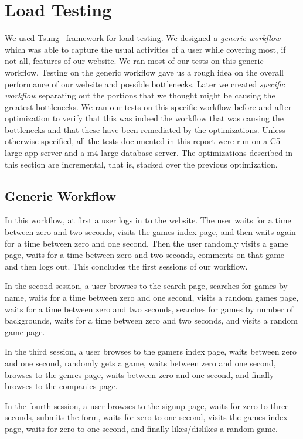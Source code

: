 \chapter{Load Testing}
We used Tsung~\cite{tsung} framework for load testing. We designed a \textit{generic workflow} which was able to capture the usual activities of a user while covering most, if not all, features of our website. We ran most of our tests on this generic workflow. Testing on the generic workflow gave us a rough idea on the overall performance of our website and possible bottlenecks. Later we created \textit{specific workflow} separating out the portions that we thought might be causing the greatest bottlenecks. We ran our tests on this specific workflow before and after optimization to verify that this was indeed the workflow that was causing the bottlenecks and that these have been remediated by the optimizations. Unless otherwise specified, all the tests documented in this report were run on a C5 large app server and a m4 large database server. The optimizations described in this section are incremental, that is, stacked over the previous optimization.

\section{Generic Workflow}\label{sec:generic-workflow}
In this workflow, at first a user logs in to the website. The user waits for a time between zero and two seconds, visits the games index page, and then waits again for a time between zero and one second. Then the user randomly visits a game page, waits for a time between zero and two seconds, comments on that game and then logs out. This concludes the first sessions of our workflow. 

In the second session, a user browses to the search page, searches for games by name, waits for a time between zero and one second, visits a random games page, waits for a time between zero and two seconds, searches for games by number of backgrounds, waits for a time between zero and two seconds, and visits a random game page. 

In the third session, a user browses to the gamers index page, waits between zero and one second, randomly gets a game, waits between zero and one second, browses to the genres page, waits between zero and one second, and finally browses to the companies page.

In the fourth session, a user browses to the signup page, waits for zero to three seconds, submits the form, waits for zero to one second, visits the games index page, waits for zero to one second, and finally likes/dislikes a random game.

